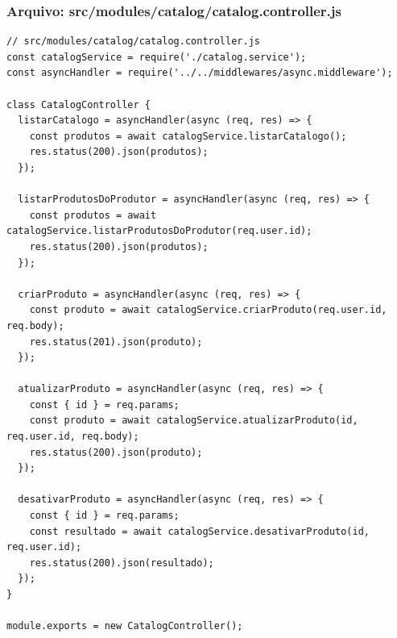 \subsubsection*{Arquivo: src/modules/catalog/catalog.controller.js}
\begin{lstlisting}[caption={src/modules/catalog/catalog.controller.js}]
// src/modules/catalog/catalog.controller.js
const catalogService = require('./catalog.service');
const asyncHandler = require('../../middlewares/async.middleware');

class CatalogController {
  listarCatalogo = asyncHandler(async (req, res) => {
    const produtos = await catalogService.listarCatalogo();
    res.status(200).json(produtos);
  });

  listarProdutosDoProdutor = asyncHandler(async (req, res) => {
    const produtos = await catalogService.listarProdutosDoProdutor(req.user.id);
    res.status(200).json(produtos);
  });

  criarProduto = asyncHandler(async (req, res) => {
    const produto = await catalogService.criarProduto(req.user.id, req.body);
    res.status(201).json(produto);
  });

  atualizarProduto = asyncHandler(async (req, res) => {
    const { id } = req.params;
    const produto = await catalogService.atualizarProduto(id, req.user.id, req.body);
    res.status(200).json(produto);
  });

  desativarProduto = asyncHandler(async (req, res) => {
    const { id } = req.params;
    const resultado = await catalogService.desativarProduto(id, req.user.id);
    res.status(200).json(resultado);
  });
}

module.exports = new CatalogController();\end{lstlisting}
\vspace{0.5cm}
